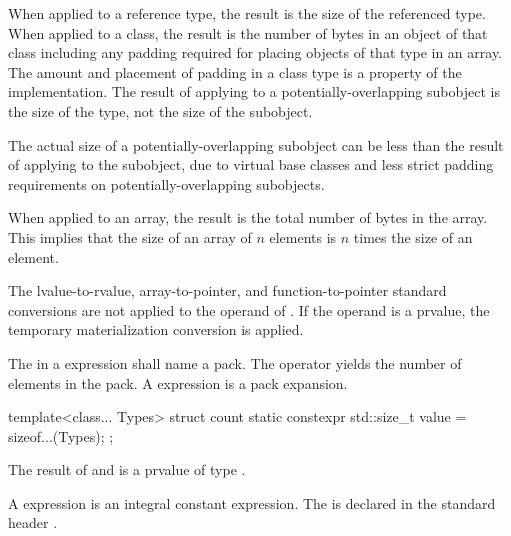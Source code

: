 \pnum
{}%
When applied to a reference type, the result is the size
of the referenced type.
%
When applied to a class, the result is the number of bytes in an object
of that class including any padding required for placing objects of that
type in an array.
The amount and placement of padding in a class type
is a property of the implementation.
The result of applying  to a
potentially-overlapping subobject is
the size of the type, not the size of the subobject.
\begin{footnote}
The actual size of a potentially-overlapping subobject
can be less than the result of
applying  to the subobject, due to virtual base classes
and less strict padding requirements on potentially-overlapping subobjects.
\end{footnote}
%
When applied to an array, the result is the total number of bytes in the
array. This implies that the size of an array of $n$ elements is
$n$ times the size of an element.

\pnum
The lvalue-to-rvalue,
array-to-pointer, and
function-to-pointer standard conversions are not
applied to the operand of .
If the operand is a prvalue,
the temporary materialization conversion
is applied.

\pnum
The  in a  expression shall name a
pack. The  operator yields the number of elements
in the pack.
A  expression is a pack expansion.
\begin{example}
\begin{codeblock}
template<class... Types>
struct count {
  static constexpr std::size_t value = sizeof...(Types);
};
\end{codeblock}
\end{example}

\pnum
{}%
%
The result of  and  is a prvalue of type
.
\begin{note}
A  expression
is an integral constant expression.
The   is declared in the standard header
.
\end{note}

